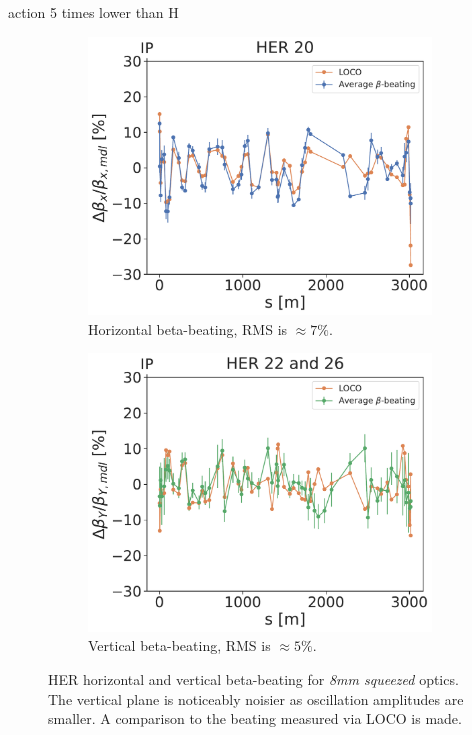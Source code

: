 action 5 times lower than H

\begin{figure}[!htb]
    \centering
    \begin{subfigure}[b]{0.48\textwidth}
        \includegraphics[width=\linewidth]{images/kek/her_20_bet_x_unzoomed.pdf}
        \caption{Horizontal beta-beating, RMS is $\approx 7\%$.}
    \end{subfigure}
    \hfill
    \begin{subfigure}[b]{0.48\textwidth}
        \includegraphics[width=\linewidth]{images/kek/her_22_26_bet_y_unzoomed.pdf}
        \caption{Vertical beta-beating, RMS is $\approx 5\%$.}
    \end{subfigure}
    \caption{HER horizontal and vertical beta-beating for \textit{8mm squeezed} optics. The vertical
    plane is noticeably noisier as oscillation amplitudes are smaller. A comparison to the beating
    measured via LOCO is made.}
    \label{fig:kek:beating_her_squeezed}
\end{figure}


